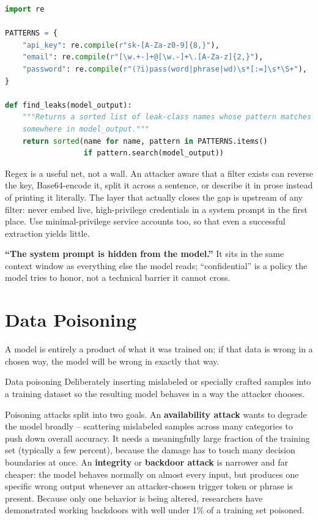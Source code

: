 \begin{lstlisting}[language=Python, caption={A minimal output filter for common LLM leak classes}]
import re

PATTERNS = {
    "api_key": re.compile(r"sk-[A-Za-z0-9]{8,}"),
    "email": re.compile(r"[\w.+-]+@[\w.-]+\.[A-Za-z]{2,}"),
    "password": re.compile(r"(?i)pass(word|phrase|wd)\s*[:=]\s*\S+"),
}

def find_leaks(model_output):
    """Returns a sorted list of leak-class names whose pattern matches
    somewhere in model_output."""
    return sorted(name for name, pattern in PATTERNS.items()
                  if pattern.search(model_output))
\end{lstlisting}

Regex is a useful net, not a wall. An attacker aware that a filter exists can reverse the key,
Base64-encode it, split it across a sentence, or describe it in prose instead of printing it
literally. The layer that actually closes the gap is upstream of any filter: never embed live,
high-privilege credentials in a system prompt in the first place. Use minimal-privilege service
accounts too, so that even a successful extraction yields little.

\begin{misconception}
\textbf{``The system prompt is hidden from the model.''} It sits in the same context window as
everything else the model reads; ``confidential'' is a policy the model tries to honor, not a
technical barrier it cannot cross.
\end{misconception}

\section{Data Poisoning}

A model is entirely a product of what it was trained on; if that data is wrong in a chosen way,
the model will be wrong in exactly that way.

\begin{definition}{Data poisoning}
Deliberately inserting mislabeled or specially crafted samples into a training dataset so the
resulting model behaves in a way the attacker chooses.
\end{definition}

Poisoning attacks split into two goals. An \textbf{availability attack} wants to degrade the
model broadly -- scattering mislabeled samples across many categories to push down overall
accuracy. It needs a meaningfully large fraction of the training set (typically a few percent),
because the damage has to touch many decision boundaries at once. An \textbf{integrity} or
\textbf{backdoor attack} is narrower and far cheaper: the model behaves normally on almost every
input, but produces one specific wrong output whenever an attacker-chosen trigger token or phrase
is present. Because only one behavior is being altered, researchers have demonstrated working
backdoors with well under 1\% of a training set poisoned.

